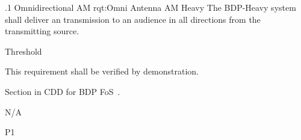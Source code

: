 
\ONERQMTVKPP
{\RqtNumberBase.1}
{Omnidirectional AM}
{rqt:Omni Antenna AM Heavy}
{The BDP-Heavy system shall deliver an \AM transmission to an audience in all directions from the transmitting source.}%
{
	\item [Phase 1] Threshold
}
{This requirement shall be verified by demonstration.}
{
\item [5.1.1] Section in CDD for BDP FoS~\cite{ref__BDP_FOS_CDD}.	
} 
{
	\item N/A
}
{P1}

